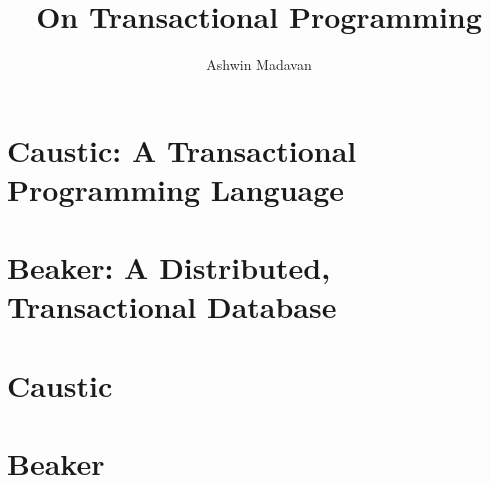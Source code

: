 \documentclass[12pt]{report}
\begin{document}
\title{On Transactional Programming}
\author{Ashwin Madavan}
\maketitle



\tableofcontents

\chapter{Caustic: A Transactional Programming Language}


\chapter{Beaker: A Distributed, Transactional Database}


\appendix
\chapter{Caustic}


\chapter{Beaker}


\printbibliography
\end{document}
